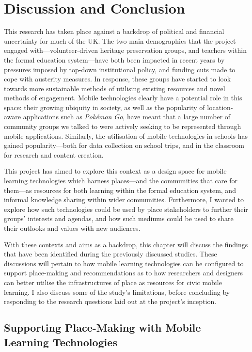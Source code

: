 \chapter{Discussion and Conclusion}

This research has taken place against a backdrop of political and financial uncertainty for much of the UK. The two main demographics that the project engaged with---volunteer-driven heritage preservation groups, and teachers within the formal education system---have both been impacted in recent years by pressures imposed by top-down institutional policy, and funding cuts made to cope with austerity measures. In response, these groups have started to look towards more sustainable methods of utilising existing resources and novel methods of engagement. Mobile technologies clearly have a potential role in this space: their growing ubiquity in society, as well as the popularity of location-aware applications such as \textit{Pok\'emon Go}, have meant that a large number of community groups we talked to were actively seeking to be represented through mobile applications. Similarly, the utilisation of mobile technologies in schools has gained popularity---both for data collection on school trips, and in the classroom for research and content creation.

This project has aimed to explore this context as a design space for mobile learning technologies which harness places---and the communities that care for them---as resources for both learning within the formal education system, and informal knowledge sharing within wider communities. Furthermore, I wanted to explore how such technologies could be used by place stakeholders to further their groups' interests and agendas, and how such mediums could be used to share their outlooks and values with new audiences.

With these contexts and aims as a backdrop, this chapter will discuss the findings that have been identified during the previously discussed studies. These discussions will pertain to how mobile learning technologies can be configured to support place-making and recommendations as to how researchers and designers can better utilise the infrastructures of place as resources for civic mobile learning. I also discuss some of the study's limitations, before concluding by responding to the research questions laid out at the project's inception.


\section{Supporting Place-Making with Mobile Learning Technologies}

